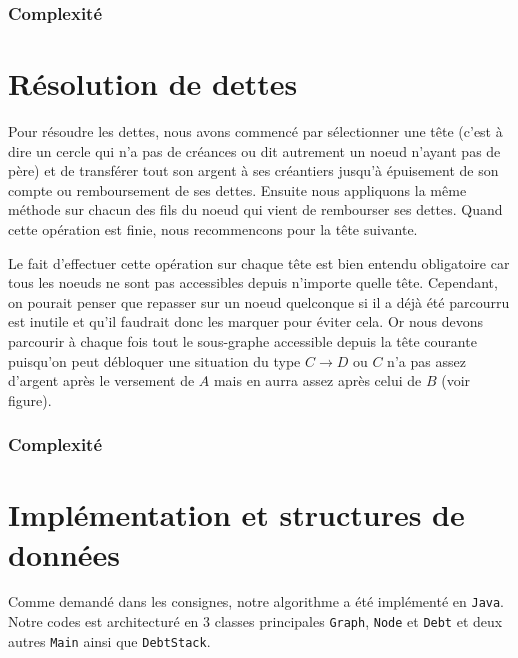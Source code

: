 \documentclass[12pt, oneside]{article}
\begin{document}
\subsubsection{Complexité}


\section{Résolution de dettes}
Pour résoudre les dettes, nous avons commencé par sélectionner une tête (c'est à dire un cercle qui n'a pas de créances ou dit autrement un noeud n'ayant pas de père) et de transférer tout son argent à ses créantiers jusqu'à épuisement de son compte ou remboursement de ses dettes. Ensuite nous appliquons la même méthode sur chacun des fils du noeud qui vient de rembourser ses dettes. Quand cette opération est finie, nous recommencons pour la tête suivante.

Le fait d'effectuer cette opération sur chaque tête est bien entendu obligatoire car tous les noeuds ne sont pas accessibles depuis n'importe quelle tête. Cependant, on pourait penser que repasser sur un noeud quelconque si il a déjà été parcourru est inutile et qu'il faudrait donc les marquer pour éviter cela. Or nous devons parcourir à chaque fois tout le sous-graphe accessible depuis la tête courante puisqu'on peut débloquer une situation du type $C \rightarrow D$ ou $C$ n'a pas assez d'argent après le versement de $A$ mais en aurra assez après celui de $B$ (voir figure).
\subsubsection{Complexité}

\section{Implémentation et structures de données}
Comme demandé dans les consignes, notre algorithme a été implémenté en \texttt{Java}. Notre codes est architecturé en 3 classes principales \texttt{Graph}, \texttt{Node} et \texttt{Debt} et deux autres \texttt{Main} ainsi que \texttt{DebtStack}.
\end{document}
